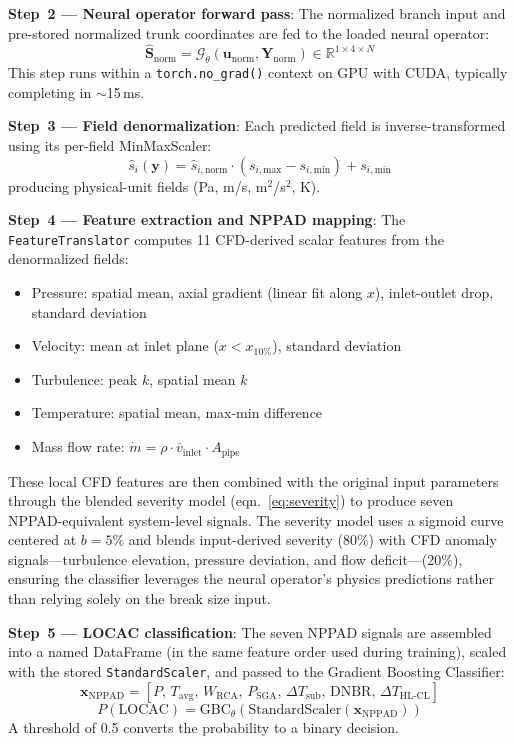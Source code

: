 \documentclass[conference]{IEEEtran}
\begin{document}
\textbf{Step~2 --- Neural operator forward pass}: The normalized branch input and pre-stored normalized trunk coordinates are fed to the loaded neural operator:
\begin{equation}
\hat{\bm{S}}_\text{norm} = \mathcal{G}_\theta(\bm{u}_\text{norm}, \bm{Y}_\text{norm}) \in \mathbb{R}^{1 \times 4 \times N}
\end{equation}
This step runs within a \texttt{torch.no\_grad()} context on GPU with CUDA, typically completing in $\sim$15\,ms.

\textbf{Step~3 --- Field denormalization}: Each predicted field is inverse-transformed using its per-field MinMaxScaler:
\begin{equation}
\hat{s}_i(\bm{y}) = \hat{s}_{i,\text{norm}} \cdot (s_{i,\text{max}} - s_{i,\text{min}}) + s_{i,\text{min}}
\end{equation}
producing physical-unit fields (Pa, m/s, m$^2$/s$^2$, K).

\textbf{Step~4 --- Feature extraction and NPPAD mapping}: The \texttt{FeatureTranslator} computes 11 CFD-derived scalar features from the denormalized fields:
\begin{itemize}
    \item Pressure: spatial mean, axial gradient (linear fit along $x$), inlet-outlet drop, standard deviation
    \item Velocity: mean at inlet plane ($x < x_{10\%}$), standard deviation
    \item Turbulence: peak $k$, spatial mean $k$
    \item Temperature: spatial mean, max-min difference
    \item Mass flow rate: $\dot{m} = \rho \cdot \bar{v}_\text{inlet} \cdot A_\text{pipe}$
\end{itemize}

These local CFD features are then combined with the original input parameters through the blended severity model (eqn.~\ref{eq:severity}) to produce seven NPPAD-equivalent system-level signals. The severity model uses a sigmoid curve centered at $b = 5\%$ and blends input-derived severity (80\%) with CFD anomaly signals---turbulence elevation, pressure deviation, and flow deficit---(20\%), ensuring the classifier leverages the neural operator's physics predictions rather than relying solely on the break size input.

\textbf{Step~5 --- LOCAC classification}: The seven NPPAD signals are assembled into a named DataFrame (in the same feature order used during training), scaled with the stored \texttt{StandardScaler}, and passed to the Gradient Boosting Classifier:
\begin{equation}
\bm{x}_{\text{NPPAD}} =
\left[
P,\,
T_{\text{avg}},\,
W_{\text{RCA}},\,
P_{\text{SGA}},\,
\Delta T_{\text{sub}},\,
\mathrm{DNBR},\,
\Delta T_{\text{HL-CL}}
\right]
\end{equation}
\begin{equation}
P(\mathrm{LOCAC}) =
\mathrm{GBC}_{\theta}\!\left(
\mathrm{StandardScaler}\!\left(\bm{x}_{\text{NPPAD}}\right)
\right)
\end{equation}
A threshold of 0.5 converts the probability to a binary decision.
\end{document}
